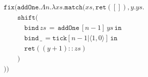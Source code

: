 $$
\begin{array}{l}
\texttt{fix}(\texttt{addOne}.\Lambda n.\lambda xs.\texttt{match}(xs,\texttt{ret}([]),y.ys.\\[-2mm]
  \hspace{2em} \texttt{shift}(\\[-2mm]
  \hspace{3em} \texttt{bind} \, zs \, = \, \texttt{addOne} \, [n-1] \, ys \, \texttt{in}\\[-2mm]
  \hspace{3em} \texttt{bind} \, \_ \, =  \texttt{tick}[n-1|\langle 1,0 \rangle] \, \texttt{in}\\[-2mm]
  \hspace{3em} \texttt{ret}((y+1)::zs)\\[-2mm]
  \hspace{2em})\\[-2mm]
))
\end{array}
$$